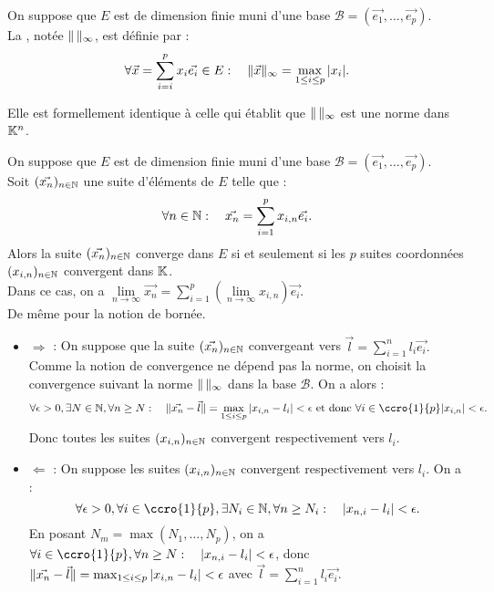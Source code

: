 \documentclass{book}
\begin{document}
\begin{DefinitionProposition}
On suppose que $E$ est de dimension finie muni d'une base $\mathcal{B} = (\vec{e_1}, \dots, \vec{e_p})$.\\
La , notée $\mathopen\lVert \, \mathclose\rVert_\infty$, est  définie par :
$$\forall \vec{x}=\sum_{i=i}^p x_i\vec{e_i} \in  E:\quad \mathopen\lVert \vec{x} \mathclose\rVert_\infty=\max_{1\leq i\leq p}|x_i|.$$ 
\end{DefinitionProposition}
\begin{Demonstration}
Elle est formellement identique à celle qui établit que $\mathopen\lVert \, \mathclose\rVert_{\infty}$ est une norme dans $\mathbb{K}^n$.
\end{Demonstration}
\begin{Proposition}
On suppose que $E$ est de dimension finie muni d'une base $\mathcal{B} = (\vec{e_1}, \dots, \vec{e_p})$.\\
Soit $(\vec{x_n})_{n\in\mathbb{N}}$ une suite d'éléments de $E$ telle que : 
$$\forall  n\in\mathbb{N} : \quad \vec{x_n} = \sum_{i=1}^p x_{i,n} \vec{e_i}.$$
Alors la suite $(\vec{x_n})_{n\in\mathbb{N}}$ converge dans $E$ si et seulement si les $p$ suites coordonnées $(x_{i,n})_{n\in\mathbb{N}}$ convergent dans $\mathbb{K}$.\\
Dans ce cas, on a $\lim\limits_{n\to\infty} \vec{x_n} = \sum_{i=1}^p (\lim\limits_{n\to\infty}x_{i,n}) \vec{e_i}.$\\
De même pour la notion de bornée.
\end{Proposition}
\begin{Demonstration}
\begin{itemize}
\item $\Longrightarrow$ : On suppose que la suite $(\vec{x_n})_{n\in\mathbb{N}}$ convergeant vers  $\vec{l}=\sum_{i=1}^n l_i \vec{e_i}.$ Comme la notion de convergence ne dépend pas la norme, on choisit la convergence suivant la norme $\mathopen\lVert \, \mathclose\rVert_\infty$ dans la base $\mathcal{B}$. On a alors :
$$\forall \epsilon >0,\exists N\in \N, \forall n\geq N:\quad \norme{\vec{x_n}-\vec{l}}=\max_{1 \leq i \leq p }|x_{i,n}-l_i|<\epsilon \text{ et donc }\forall i\in\ccro{1}{p}|x_{i,n}|<\epsilon.$$
Donc toutes les suites $(x_{i,n})_{n\in\mathbb{N}}$ convergent respectivement vers $l_i$.
\item $\Longleftarrow$ : On suppose les suites $(x_{i,n})_{n\in\mathbb{N}}$ convergent respectivement vers $l_i$. On a :
$$\forall \epsilon >0, \forall i\in\ccro{1}{p},\exists N_i\in \N, \forall n\geq N_i:\quad |x_{n,i}-l_i|<\epsilon.$$
En posant $N_m=\max(N_1,\dots,N_p)$, on a   $\forall i\in\ccro{1}{p}, \forall n\geq N:\quad |x_{n,i}-l_i|<\epsilon$, donc $\mathopen\lVert \vec{x_n}-\vec{l} \mathclose\rVert=\max_{1 \leq i \leq p }|x_{i,n}-l_i|<\epsilon$ avec $\vec{l}=\sum_{i=1}^n l_i \vec{e_i}$.
\end{itemize}
\end{Demonstration}
\end{document}
